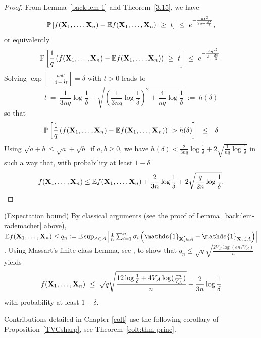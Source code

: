 \begin{proof}
From Lemma~\ref{back:lem-1} and Theorem~\ref{3.15}, we have
$$\mathbb{P}\left [ f(\mathbf X_1,\ldots,\mathbf X_n) - \mathbb{E} f(\mathbf X_1,\ldots,\mathbf X_n) ~\ge~ t \right] ~\le~ e^{-\frac{n t^2}{2q + \frac{2t}{3}} },$$
or equivalently
$$\mathbb{P}\left [ \frac{1}{q} \left(f(\mathbf X_1,\ldots,\mathbf X_n) - \mathbb{E} f(\mathbf X_1,\ldots,\mathbf X_n)\right) ~\ge~ t \right] ~\le~ e^{-\frac{n qt^2}{2 + \frac{2t}{3}} }.$$
Solving $ \exp \left [ - \frac{nq t^2}{4  + \frac{2}{3} t}\right]=\delta$ with $t > 0$ leads to $$t ~=~ \frac{1}{3nq} \log \frac{1}{\delta} + \sqrt{\left ( \frac{1}{3nq} \log \frac{1}{\delta}\right)^{2} + \frac{4}{nq} \log \frac{1}{\delta} } ~:=~h(\delta)$$ so that
\begin{align*}
\mathbb{P} \left [ \frac{1}{q} \left(f(\mathbf X_1,\ldots,\mathbf X_n) - \mathbb{E} f(\mathbf X_1,\ldots,\mathbf X_n)\right)  ~> h(\delta) \right] ~~\le~~ \delta
\end{align*}
\noindent
Using $\sqrt{a+b} \le \sqrt a + \sqrt b~$ if $a,b \ge 0$, we have $h(\delta) < \frac{2}{3nq} \log \frac{1}{\delta} + 2 \sqrt{\frac{1}{nq} \log \frac{1}{\delta}} $ in such a way that, with probability at least $1-\delta$
\begin{align*}
f(\mathbf X_1,\ldots,\mathbf X_n) \le \mathbb{E}f(\mathbf X_1,\ldots,\mathbf X_n) + \frac{2}{3n} \log{\frac{1}{\delta}} + 2\sqrt{\frac{q}{2n} \log{\frac{1}{\delta}}}.
\end{align*}  
\end{proof}
%
\begin{remark}({\sc Expectation bound})
By classical arguments (see the proof of Lemma~\ref{back:lem-rademacher} above), $\mathbb{E}f(\mb X_1,\ldots,\mb X_n) \le q_n := \mathbb{E} \sup_{A \in \mathcal{A}} \left |\frac{1}{n} \sum_{i=1}^{n} \sigma_i \left ( \mathds{1}_{\mb X_i^{'} \in A} - \mathds{1}_{\mb X_i \in A} \right) \right|$. Using Massart's finite class Lemma, see \cite{Massart2000}, to show that $q_n \le \sqrt{q} \sqrt{\frac{2 V_\mathcal{A} \log(en/V_\mathcal{A})}{n}}$ yields
\begin{align*}
f(\mathbf X_1,\ldots,\mathbf X_n) ~\le~ \sqrt{q} \sqrt{\frac{12 \log\frac{1}{\delta} + 4 V_\mathcal{A} \log(\frac{en}{V_\mathcal{A}})}{n}} + \frac{2}{3n} \log\frac{1}{\delta}
\end{align*}
with probability at least $1-\delta$.
\end{remark}
%
Contributions detailed in Chapter \ref{colt} use the following corollary of
Proposition~\ref{TVCsharp}, see Theorem~\ref{colt:thm-princ}.

